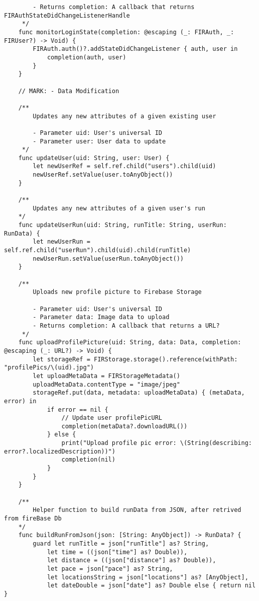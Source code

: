 \begin{verbatim}
        - Returns completion: A callback that returns FIRAuthStateDidChangeListenerHandle
     */
    func monitorLoginState(completion: @escaping (_: FIRAuth, _: FIRUser?) -> Void) {
        FIRAuth.auth()?.addStateDidChangeListener { auth, user in
            completion(auth, user)
        }
    }

    // MARK: - Data Modification

    /**
        Updates any new attributes of a given existing user
     
        - Parameter uid: User's universal ID
        - Parameter user: User data to update
     */
    func updateUser(uid: String, user: User) {
        let newUserRef = self.ref.child("users").child(uid)
        newUserRef.setValue(user.toAnyObject())
    }

    /**
        Updates any new attributes of a given user's run
    */
    func updateUserRun(uid: String, runTitle: String, userRun: RunData) {
        let newUserRun = self.ref.child("userRun").child(uid).child(runTitle)
        newUserRun.setValue(userRun.toAnyObject())
    }

    /**
        Uploads new profile picture to Firebase Storage
     
        - Parameter uid: User's universal ID
        - Parameter data: Image data to upload
        - Returns completion: A callback that returns a URL?
     */
    func uploadProfilePicture(uid: String, data: Data, completion: @escaping (_: URL?) -> Void) {
        let storageRef = FIRStorage.storage().reference(withPath: "profilePics/\(uid).jpg")
        let uploadMetaData = FIRStorageMetadata()
        uploadMetaData.contentType = "image/jpeg"
        storageRef.put(data, metadata: uploadMetaData) { (metaData, error) in
            if error == nil {
                // Update user profilePicURL
                completion(metaData?.downloadURL())
            } else {
                print("Upload profile pic error: \(String(describing: error?.localizedDescription))")
                completion(nil)
            }
        }
    }

    /**
        Helper function to build runData from JSON, after retrived from fireBase Db
    */
    func buildRunFromJson(json: [String: AnyObject]) -> RunData? {
        guard let runTitle = json["runTitle"] as? String,
            let time = ((json["time"] as? Double)),
            let distance = ((json["distance"] as? Double)),
            let pace = json["pace"] as? String,
            let locationsString = json["locations"] as? [AnyObject],
            let dateDouble = json["date"] as? Double else { return nil }


\end{verbatim}
